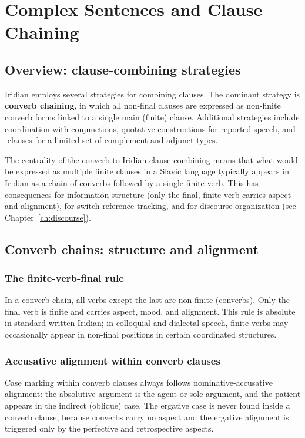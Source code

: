 \chapter{Complex Sentences and Clause Chaining}\label{ch:complex}

\section{Overview: clause-combining strategies}

Iridian employs several strategies for combining clauses. The dominant strategy is \textbf{converb chaining}, in which all non-final clauses are expressed as non-finite converb forms linked to a single main (finite) clause. Additional strategies include coordination with conjunctions, quotative constructions for reported speech, and -clauses for a limited set of complement and adjunct types.

The centrality of the converb to Iridian clause-combining means that what would be expressed as multiple finite clauses in a Slavic language typically appears in Iridian as a chain of converbs followed by a single finite verb. This has consequences for information structure (only the final, finite verb carries aspect and alignment), for switch-reference tracking, and for discourse organization (see Chapter~\ref{ch:discourse}).

\section{Converb chains: structure and alignment}\label{sec:converb-chains}

\subsection{The finite-verb-final rule}

In a converb chain, all verbs except the last are non-finite (converbs). Only the final verb is finite and carries aspect, mood, and alignment. This rule is absolute in standard written Iridian; in colloquial and dialectal speech, finite verbs may occasionally appear in non-final positions in certain coordinated structures.

\subsection{Accusative alignment within converb clauses}

Case marking within converb clauses always follows nominative-accusative alignment: the absolutive argument is the agent or sole argument, and the patient appears in the indirect (oblique) case. The ergative case is never found inside a converb clause, because converbs carry no aspect and the ergative alignment is triggered only by the perfective and retrospective aspects.

